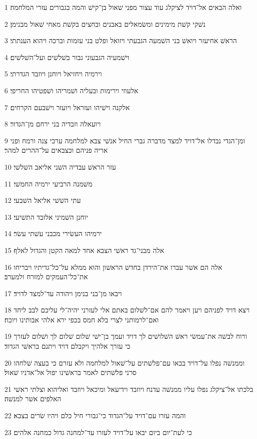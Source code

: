 \par 1 ואלה הבאים אל־דויד לציקלג עוד עצור מפני שׁאול בן־קישׁ והמה בגבורים עזרי המלחמה׃
\par 2 נשׁקי קשׁת מימינים ומשׂמאלים באבנים ובחצים בקשׁת מאחי שׁאול מבנימן׃
\par 3 הראשׁ אחיעזר ויואשׁ בני השׁמעה הגבעתי ויזואל ופלט בני עזמות וברכה ויהוא הענתתי׃
\par 4 וישׁמעיה הגבעוני גבור בשׁלשׁים ועל־השׁלשׁים׃
\par 5 וירמיה ויחזיאל ויוחנן ויוזבד הגדרתי׃
\par 6 אלעוזי וירימות ובעליה ושׁמריהו ושׁפטיהו החריפי׃
\par 7 אלקנה וישׁיהו ועזראל ויועזר וישׁבעם הקרחים׃
\par 8 ויועאלה וזבדיה בני ירחם מן־הגדור׃
\par 9 ומן־הגדי נבדלו אל־דויד למצד מדברה גברי החיל אנשׁי צבא למלחמה ערכי צנה ורמח ופני אריה פניהם וכצבאים על־ההרים למהר׃
\par 10 עזר הראשׁ עבדיה השׁני אליאב השׁלשׁי׃
\par 11 משׁמנה הרביעי ירמיה החמשׁי׃
\par 12 עתי השׁשׁי אליאל השׁבעי׃
\par 13 יוחנן השׁמיני אלזבד התשׁיעי׃
\par 14 ירמיהו העשׂירי מכבני עשׁתי עשׂר׃
\par 15 אלה מבני־גד ראשׁי הצבא אחד למאה הקטן והגדול לאלף׃
\par 16 אלה הם אשׁר עברו את־הירדן בחדשׁ הראשׁון והוא ממלא על־כל־גדיתיו ויבריחו את־כל־העמקים למזרח ולמערב׃
\par 17 ויבאו מן־בני בנימן ויהודה עד־למצד לדויד׃
\par 18 ויצא דויד לפניהם ויען ויאמר להם אם־לשׁלום באתם אלי לעזרני יהיה־לי עליכם לבב ליחד ואם־לרמותני לצרי בלא חמס בכפי ירא אלהי אבותינו ויוכח׃
\par 19 ורוח לבשׁה את־עמשׂי ראשׁ השׁלושׁים לך דויד ועמך בן־ישׁי שׁלום שׁלום לך ושׁלום לעזרך כי עזרך אלהיך ויקבלם דויד ויתנם בראשׁי הגדוד׃
\par 20 וממנשׁה נפלו על־דויד בבאו עם־פלשׁתים על־שׁאול למלחמה ולא עזרם כי בעצה שׁלחהו סרני פלשׁתים לאמר בראשׁינו יפול אל־אדניו שׁאול׃
\par 21 בלכתו אל־ציקלג נפלו עליו ממנשׁה עדנח ויוזבד וידיעאל ומיכאל ויוזבד ואליהוא וצלתי ראשׁי האלפים אשׁר למנשׁה׃
\par 22 והמה עזרו עם־דויד על־הגדוד כי־גבורי חיל כלם ויהיו שׂרים בצבא׃
\par 23 כי לעת־יום ביום יבאו על־דויד לעזרו עד־למחנה גדול כמחנה אלהים׃
